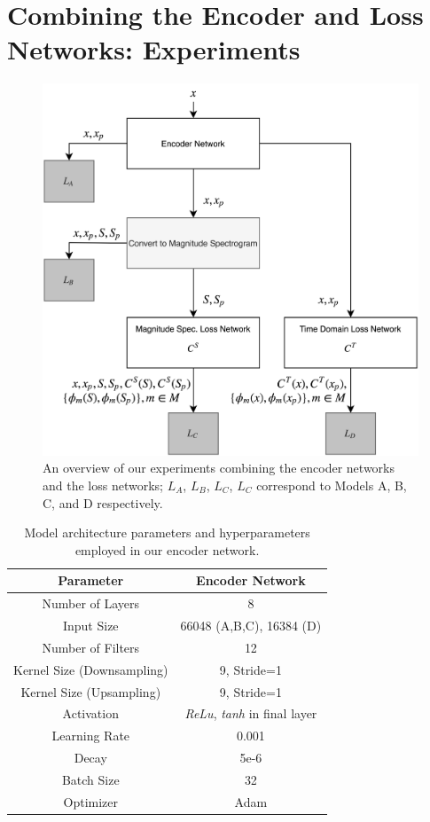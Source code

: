 \documentclass[sigconf]{acmart}
\begin{document}
\section{Combining the Encoder and Loss Networks: Experiments}
 
\begin{figure}[h!]
    \centering
    \includegraphics[width=\columnwidth]{System.png}
    \caption{An overview of our experiments combining the encoder networks and the loss networks; $L_{A}$, $L_{B}$, $L_{C}$, $L_{C}$ correspond to Models A, B, C, and D respectively.}
    \label{experiments}
\end{figure}

\begin{table}[h!]
    \centering
    \begin{tabular}{|c||c|}
        \hline
        \textbf{Parameter} & \textbf{Encoder Network} \\
        \hline
        Number of Layers & 8 \\
        Input Size & 66048 (A,B,C), 16384 (D) \\
        Number of Filters & 12 \\
        Kernel Size (Downsampling) & 9, Stride=1 \\
        Kernel Size (Upsampling) & 9, Stride=1 \\
        Activation &  \textit{ReLu}, \textit{tanh} in final layer \\
        Learning Rate & 0.001 \\
        Decay & 5e-6 \\
        Batch Size & 32 \\
        Optimizer & Adam \\
        \hline
    \end{tabular}
    \caption{Model architecture parameters and hyperparameters employed in our encoder network.}
    \label{exp-params}
\end{table}
\end{document}
